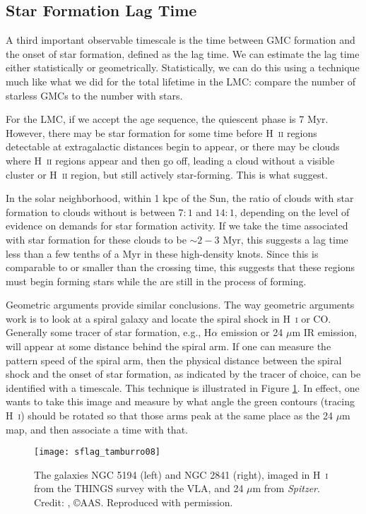 \subsection{Star Formation Lag Time}

A third important observable timescale is the time between GMC formation and the onset of star formation, defined as the lag time. We can estimate the lag time either statistically or geometrically. Statistically, we can do this using a technique much like what we did for the total lifetime in the LMC: compare the number of starless GMCs to the number with stars.

For the LMC, if we accept the \citet{kawamura09a} age sequence, the quiescent phase is 7 Myr. However, there may be star formation for some time before H~\textsc{ii} regions detectable at extragalactic distances begin to appear, or there may be clouds where H~\textsc{ii} regions appear and then go off, leading a cloud without a visible cluster or H~\textsc{ii} region, but still actively star-forming. This is what \citet{goldbaum11a} suggest.

In the solar neighborhood, within 1 kpc of the Sun, the ratio of clouds with star formation to clouds without is between $7:1$ and $14:1$, depending on the level of evidence on demands for star formation activity. If we take the time associated with star formation for these clouds to be $\sim 2-3$ Myr, this suggests a lag time less than a few tenths of a Myr in these high-density knots. Since this is comparable to or smaller than the crossing time, this suggests that these regions must begin forming stars while the are still in the process of forming.

Geometric arguments provide similar conclusions. The way geometric arguments work is to look at a spiral galaxy and locate the spiral shock in H~\textsc{i} or CO. Generally some tracer of star formation, e.g., H$\alpha$ emission or 24 $\mu$m IR emission, will appear at some distance behind the spiral arm. If one can measure the pattern speed of the spiral arm, then the physical distance between the spiral shock and the onset of star formation, as indicated by the tracer of choice, can be identified with a timescale. This technique is illustrated in Figure \ref{fig:sflag_tamburro08}. In effect, one wants to take this image and measure by what angle the green contours (tracing H~\textsc{i}) should be rotated so that those arms peak at the same place as the 24 $\mu$m map, and then associate a time with that.

\begin{figure}
\texttt{[image: sflag\_tamburro08]}
\caption[H~\textsc{i} and 24 $\mu$m maps of NGC 5194 and 2841]{
\label{fig:sflag_tamburro08}
The galaxies NGC 5194 (left) and NGC 2841 (right), imaged in H~\textsc{i} from the THINGS survey with the VLA, and 24 $\mu$m from \textit{Spitzer}. Credit: \citet{tamburro08a}, \copyright AAS. Reproduced with permission.
}
\end{figure}

